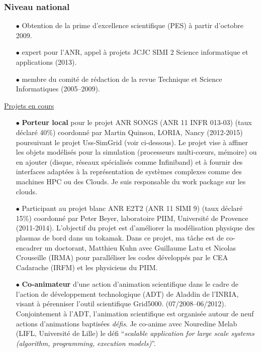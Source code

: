\documentclass[11pt]{article}
\begin{document}
\subsubsection{Niveau national}
\begin{itemize}


\item[$\bullet$] Obtention de la prime d'excellence scientifique (PES) à partir d'octobre 2009.\\

\item [$\bullet$]
expert pour l'ANR, appel à projets JCJC SIMI 2 Science informatique et applications (2013).\\

\item [$\bullet$]
membre du comité de rédaction de la revue Technique et Science Informatiques (2005--2009).\\
\end{itemize}

\underline{Projets en cours}\\
\begin{itemize}


\item[$\bullet$]
\textbf{Porteur local} pour le projet ANR SONGS (ANR 11 INFR 013-03)  (taux déclaré 40\%)
coordonné par Martin Quinson, LORIA, Nancy (2012-2015)  poursuivant le projet 
Uss-SimGrid (voir ci-dessous). Le projet vise à affiner les objets modélisés pour la 
simulation (processeurs multi-c{\oe}urs, mémoire) ou en ajouter (disque, réseaux spécialisés
comme Infiniband) et à fournir des interfaces adaptées à la représentation de systèmes
complexes comme des machines HPC ou des Clouds. Je suis responsable du work package
sur les clouds.\\

\item[$\bullet$]
Participant au projet blanc ANR E2T2 (ANR 11 SIMI 9) (taux déclaré 15\%) coordonné par 
Peter Beyer, laboratoire PIIM, Université de Provence (2011-2014). L'objectif du projet 
est d'améliorer la modélisation physique des plasmas de bord dans un tokamak. Dans ce
projet, ma tâche est de co-encadrer un doctorant, Matthieu Kuhn avec Guillaume Latu et
Nicolas Crouseille (IRMA) pour paralléliser les codes développés par le CEA Cadarache 
(IRFM) et les physiciens du PIIM. \\

\item[$\bullet$]
\textbf{Co-animateur} d'une action d'animation scientifique 
dans le cadre de l'action de développement technologique (ADT) de Aladdin de l'INRIA, 
visant à pérenniser l'outil scientifique Grid5000. (07/2008--06/2012). 
Conjointement à l'ADT, l'animation scientifique est organisée autour de neuf actions d'animations baptisées \emph{défis}.
Je co-anime avec Nouredine Melab (LIFL, Université de Lille) le défi 
``{\em scalable application for large scale systems (algorithm, programming, execution models)}''.\\
\end{itemize}
\end{document}
